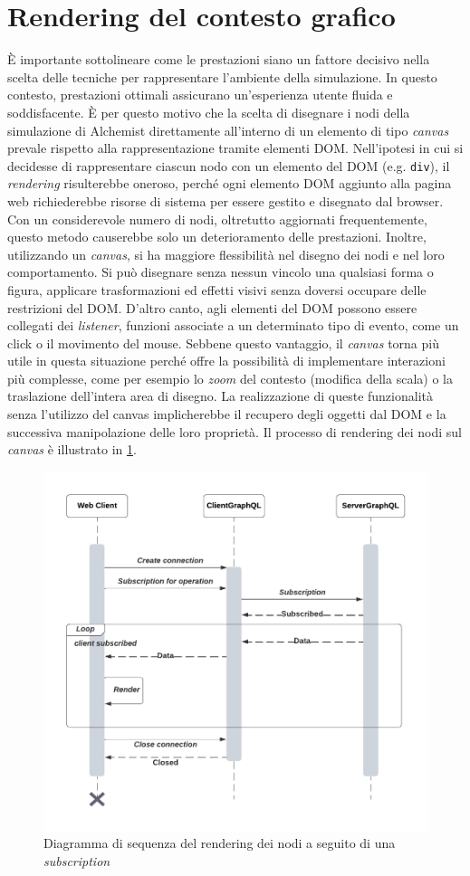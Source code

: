 \section{Rendering del contesto grafico}\label{section:rendering-analysis}
È importante sottolineare come le prestazioni siano un fattore decisivo nella scelta delle tecniche per rappresentare l'ambiente della simulazione.
In questo contesto, prestazioni ottimali assicurano un'esperienza utente fluida e soddisfacente. È per questo motivo che la scelta di disegnare i nodi della simulazione di Alchemist direttamente all'interno di un elemento di tipo \textit{canvas} prevale rispetto alla rappresentazione tramite elementi \ac{DOM}. Nell'ipotesi in cui si decidesse di rappresentare ciascun nodo con un elemento del DOM (e.g. \texttt{div}), il \textit{rendering} risulterebbe oneroso, perché ogni elemento \ac{DOM} aggiunto alla pagina web richiederebbe risorse di sistema per essere gestito e disegnato dal browser. Con un considerevole numero di nodi, oltretutto aggiornati frequentemente, questo metodo causerebbe solo un deterioramento delle prestazioni. Inoltre, utilizzando un \textit{canvas}, si ha maggiore flessibilità nel disegno dei nodi e nel loro comportamento. Si può disegnare senza nessun vincolo una qualsiasi forma o figura, applicare trasformazioni ed effetti visivi senza doversi occupare delle restrizioni del \ac{DOM}. D'altro canto, agli elementi del \ac{DOM} possono essere collegati dei \textit{listener}, funzioni associate a un determinato tipo di evento, come un click o il movimento del mouse. Sebbene questo vantaggio, il \textit{canvas} torna più utile in questa situazione perché offre la possibilità di implementare interazioni più complesse, come per esempio lo \textit{zoom} del contesto (modifica della scala) o la traslazione dell'intera area di disegno. La realizzazione di queste funzionalità senza l'utilizzo del canvas implicherebbe il recupero degli oggetti dal \ac{DOM} e la successiva manipolazione delle loro proprietà.
Il processo di rendering dei nodi sul \textit{canvas} è illustrato in \cref{fig:rendering-graphics}.
\begin{figure}
	\centering
	\includegraphics[width=.63\linewidth]{imgs/Rendering_Diagramma_Sequenza.pdf}
	\caption{Diagramma di sequenza del rendering dei nodi a seguito di una \textit{subscription}}
	\label{fig:rendering-graphics}
\end{figure}
